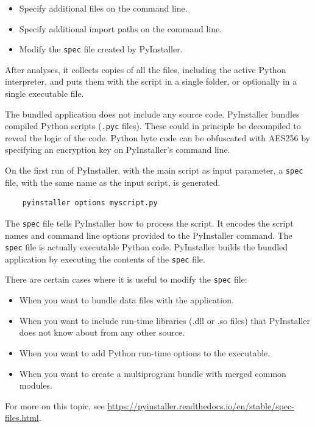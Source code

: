 \begin{itemize}
  \item Specify additional files on the command line.
  \item Specify additional import paths on the command line.
  \item Modify the \texttt{spec} file created by PyInstaller.
\end{itemize}

After analyses, it collects copies of all the files, including the active Python interpreter, and puts them with the script in a single folder, or optionally in a single executable file.

The bundled application does not include any source code. PyInstaller bundles compiled Python scripts (\texttt{.pyc} files). These could in principle be decompiled to reveal the logic of the code.
Python byte code can be obfuscated with AES256 by specifying an encryption key on PyInstaller's command line.

On the first run of PyInstaller, with the main script as input parameter, a \texttt{spec} file, with the same name as the input script, is generated.

\footnotesize
\begin{lstlisting}
    pyinstaller options myscript.py
\end{lstlisting}
\normalsize

The \texttt{spec} file tells PyInstaller how to process the script. It encodes the script names and command line options provided to the PyInstaller command. The \texttt{spec} file is actually executable Python code. PyInstaller builds the bundled application by executing the contents of the \texttt{spec} file.

There are certain cases where it is useful to modify the \texttt{spec} file:

\begin{itemize}
  \item When you want to bundle data files with the application.
  \item When you want to include run-time libraries (.dll or .so files) that PyInstaller does not know about from any other source.
  \item When you want to add Python run-time options to the executable.
  \item When you want to create a multiprogram bundle with merged common modules.
\end{itemize}


For more on this topic, see \url{https://pyinstaller.readthedocs.io/en/stable/spec-files.html}.

